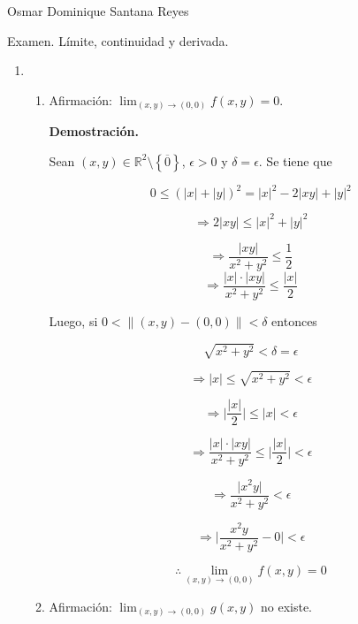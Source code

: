 \documentclass[fleqn]{article}
\begin{document}
    Osmar Dominique Santana Reyes

    Examen. Límite, continuidad y derivada.

    \begin{enumerate}
        \item 
        \begin{enumerate}
            \item Afirmación: $ \lim_{(x,y) \to (0,0)} f(x,y) = 0 $.

            \textbf{Demostración.}

            Sean $ (x,y) \in \mathbb{R}^2 \setminus \left\lbrace \overline{0} \right\rbrace $, $ \epsilon > 0 $ y $ \delta = \epsilon $. Se tiene que

            $$ 0 \leq (\lvert x \rvert + \lvert y \rvert)^2 = \lvert x \rvert^2 - 2 \lvert xy \rvert + \lvert y \rvert^2 $$

            $$ \Longrightarrow 2 \lvert xy \rvert \leq \lvert x \rvert^2 + \lvert y \rvert^2 $$

            $$ \Longrightarrow \dfrac{\lvert xy \rvert}{x^2 + y^2} \leq \dfrac{1}{2} $$
            \begin{equation}
                \Longrightarrow \dfrac{\lvert x \rvert \cdot \lvert xy \rvert}{x^2 + y^2} \leq \dfrac{\lvert x \rvert}{2}
                \label{eq:1a1}
            \end{equation}
            
            Luego, si $ 0 < \lVert (x,y) - (0,0) \rVert < \delta $ entonces

            $$ \sqrt{x^2 + y^2} < \delta = \epsilon $$

            $$ \Longrightarrow \lvert x \rvert \leq \sqrt{x^2 + y^2} < \epsilon $$

            $$ \Longrightarrow \lvert \dfrac{\lvert x \rvert}{2} \rvert \leq \lvert x \rvert < \epsilon $$

            $$ \Longrightarrow \dfrac{\lvert x \rvert \cdot \lvert xy \rvert}{x^2 + y^2} \leq \lvert \dfrac{\lvert x \rvert}{2} \rvert < \epsilon $$

            $$ \Longrightarrow \dfrac{\lvert x^2 y \rvert}{x^2 + y^2} < \epsilon $$

            $$ \Longrightarrow \lvert \dfrac{x^2 y}{x^2 + y^2} - 0 \rvert < \epsilon $$

            $$ \therefore \lim_{(x,y) \to (0,0)} f(x,y) = 0 $$

            \item Afirmación: $ \lim_{(x,y) \to (0,0)} g(x,y) $ no existe.


\end{enumerate}
\end{enumerate}
\end{document}

